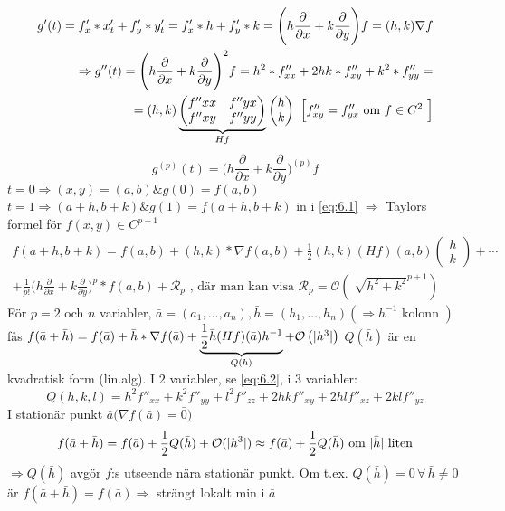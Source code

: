 \documentclass[a4paper]{article}
\DeclarePairedDelimiter \abs{\lvert}{\rvert}
\let\oldsqrt\sqrt
\renewcommand*{\sqrt}[2][\ ]{\oldsqrt[#1]{#2} }
\begin{document}
\[
\begin{split}
g'(t) = f'_x * x'_t + f'_y * y'_t = f'_x * h + f'_y * k = \Bigg( h\frac{\partial}{\partial x} + k\frac{\partial}{\partial y} \Bigg)f = (h,k) \nabla f \\
\Rightarrow g''(t) = \Bigg( h\frac{\partial}{\partial x} + k\frac{\partial}{\partial y} \Bigg)^2 f = h^2*f''_{xx} + 2hk*f''_{xy} + k^2*f''_{yy} = \\
= (h,k)
\underbrace{\begin{pmatrix}
	f''{xx} & f''{yx} \\
	f''{xy} & f''{yy} \\
\end{pmatrix}}_{Hf}
\begin{pmatrix}
	h \\
	k
\end{pmatrix}
\text{ \Big[$f''_{xy} = f''_{yx}$ om $f \in C^2$ \Big]}
\end{split}
\]
\begin{equation} \label{eq:6.2}
g^{(p)}(t) = \Bigg( h\frac{\partial}{\partial x} + k\frac{\partial}{\partial y} \Bigg)^{(p)} f
\end{equation}
$t = 0 \Rightarrow (x,y) = (a,b) \& g(0) = f(a,b)$ \newline
$t = 1 \Rightarrow (a+h,b+k) \& g(1) = f(a+h,b+k)$ in i \vref{eq:6.1}
$\Rightarrow$ Taylors formel för $f(x,y) \in C^{p+1}$
\[
\begin{split}
	f(a+h,b+k) = f(a,b) + (h,k) * \nabla f(a,b) + \frac{1}{2}(h,k)(Hf)(a,b)
	\begin{pmatrix}
		h \\
		k
	\end{pmatrix}
	+ \cdots \\
	+ \frac{1}{p!}\Big(h\frac{\partial}{\partial x} + k\frac{\partial}{\partial y})^p * f(a,b) + \mathcal{R}_p \text{ , där man kan visa } \mathcal{R}_p = \mathcal{O}\left(\sqrt{h^2 + k^2}^{p+1}\right)
\end{split}
\]
För $p=2$ och $n$ variabler, $\bar{a} = (a_1, \ldots ,a_n) , \bar{h} = (h_1, \ldots ,h_n) \left(\Rightarrow h^{-1} \text{ kolonn } \right)$ fås
$f(\bar{a}+\bar{h}) = f(\bar{a}) + \bar{h} * \nabla f(\bar{a}) + \underbrace{\frac{1}{2}\bar{h}(Hf)(\bar{a})h^{-1}}_{Q(h)} + \mathcal{O}\left(\abs{h^3}\right)$
\newpage
$Q(\bar{h})$ är en kvadratisk form (lin.alg). I $2$ variabler, se \eqref{eq:6.2}, i $3$ variabler:
$$
	Q(h,k,l) = h^2f''_{xx} + k^2f''_{yy} + l^2f''_{zz} + 2hkf''_{xy} + 2hlf''_{xz} + 2klf''_{yz}
$$
I stationär punkt $\bar{a} \Big(\nabla f(\bar{a}) = \bar{0}\Big)$
$$
	f(\bar{a}+\bar{h}) = f(\bar{a}) + \frac{1}{2}Q(\bar{h}) + \mathcal{O}(\abs{h^3}) \approx f(\bar{a}) + \frac{1}{2}Q(\bar{h}) \text{ om } \abs{\bar{h}} \text{ liten}
$$
$\Rightarrow Q(\bar{h})$ avgör $f$:s utseende nära stationär punkt. \newline Om t.ex. $Q(\bar{h}) = 0 \,\forall\, \bar{h} \neq 0$ är $f(\bar{a}+\bar{h}) = f(\bar{a}) \Rightarrow$ strängt lokalt min i $\bar{a}$
\end{document}
